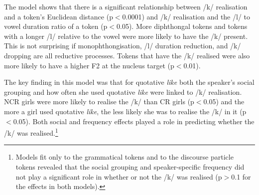 \largerpage[-1]
The model shows that there is a significant relationship between /k/ realisation and a token's Euclidean distance (p$<$0.0001) and /k/ realisation and the /l/ to vowel duration ratio of a token (p$<$0.05). More diphthongal tokens and tokens with a longer /l/ relative to the vowel were more likely to have the /k/ present. This is not surprising if monophthongisation, /l/ duration reduction, and /k/ dropping are all reductive processes. Tokens that have the /k/ realised were also more likely to have a higher F2 at the nucleus target (p$<$0.01).

The key finding in this mo\-del was that for quotative \textit{like} both the spea\-ker's social grouping and how often she used quotative \textit{like} were linked to /k/ realisation. NCR girls were more likely to realise the /k/ than CR girls (p$<$0.05) and the more a girl used quotative \textit{like}, the less likely she was to realise the /k/ in it (p$<$0.05). Both social and frequency effects played a role in predicting whether the /k/ was realised.\footnote{Models fit only to the grammatical tokens and to the discourse particle tokens revealed that the social grouping and speaker-specific frequency did not play a significant role in whether or not the /k/ was realised (p$>$0.1 for the effects in both models).}




